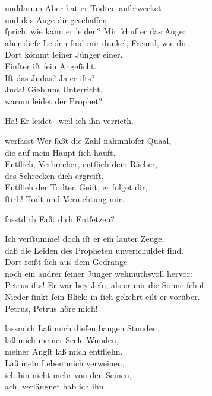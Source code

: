\documentclass[abbrwidth=6em,tocstyle=ref-genre,toe=false]{ees}
\begin{document}
{\begin{movement}{unddarum}
  \voice[Fremdling]
  Aber hat er Todten auferwecket\\
  und das Auge dir geschaffen –\\
  ſprich, wie kann er leiden?
  \clearpage
  \voice[Blindgebohrner]
  Mir ſchuf er das Auge:\\
  aber dieſe Leiden ſind mir dunkel, Freund, wie dir.\\
  Dort kömmt ſeiner Jünger einer.\\
  Finſter iſt ſein Angeſicht.\\
  Iſt das Judas? Ja er iſts?\\
  Juda! Gieb uns Unterricht,\\
  warum leidet der Prophet?

  \voice[Judas]
  Ha! Er leidet– weil ich ihn verrieth.
\end{movement}

\begin{movement}{werfasst}
  \voice[Judas]
  Wer faßt die Zahl nahmnloſer Quaal,\\
  die auf mein Haupt ſich häuft.\\
  Entflieh, Verbrecher, entflieh dem Rächer,\\
  des Schrecken dich ergreift.\\
  Entflieh der Todten Geiſt, er folget dir,\\
  ſtirb! Todt und Vernichtung mir.
\end{movement}

\begin{movement}{fasstdich}
  \voice[Fremdling]
  Faßt dich Entſetzen?

  \voice[Blindgebohrner]
  Ich verſtumme! doch iſt er ein lauter Zeuge,\\
  daß die Leiden des Propheten unverſchuldet ſind.\\
  Dort reißt ſich aus dem Gedränge\\
  noch ein andrer ſeiner Jünger wehmuthsvoll hervor:\\
  Petrus iſts! Er war bey Jeſu, als er mir die Sonne ſchuf.\\
  Nieder ſinkt ſein Blick; in ſich gekehrt eilt er vorüber. –\\
  Petrus, Petrus höre mich!
\end{movement}

\begin{movement}{lassmich}
  \voice[Petrus]
  Laß mich dieſen bangen Stunden,\\
  laß mich meiner Seele Wunden,\\
  meiner Angſt laß mich entfliehn.\\
  Laß mein Leben mich verweinen,\\
  ich bin nicht mehr von den Seinen,\\
  ach, verläugnet hab ich ihn.
\end{movement}

}
\end{document}
